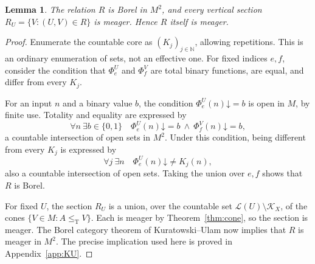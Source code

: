 \documentclass[11pt,a4paper]{article}
\newcommand{\N}{\mathbb N}
\newcommand{\leT}{\leq_{\mathrm T}}
\newcommand{\Core}[1]{\mathcal K_{#1}}
\newcommand{\Low}[1]{\mathcal L(#1)}
\newcommand{\down}{\mathord{\downarrow}}
\newtheorem{lemma}[theorem]{Lemma}
\theoremstyle{definition}\newtheorem{definition}[theorem]{Definition}
\theoremstyle{remark}\newtheorem{remark}[theorem]{Remark}
\begin{document}
\begin{lemma}\label{lem:bad-borel}
The relation $R$ is Borel in $M^2$, and every vertical section $R_U=\{V:(U,V)\in R\}$ is meager. Hence $R$ itself is meager.
\end{lemma}
\begin{proof}
Enumerate the countable core as $(K_j)_{j\in\N}$, allowing repetitions. This is an ordinary enumeration of sets, not an effective one. For fixed indices $e,f$, consider the condition that $\Phi_e^U$ and $\Phi_f^V$ are total binary functions, are equal, and differ from every $K_j$.

For an input $n$ and a binary value $b$, the condition $\Phi_e^U(n)\down=b$ is open in $M$, by finite use. Totality and equality are expressed by
\[
 \forall n\ \exists b\in\{0,1\}\quad
 \Phi_e^U(n)\down=b\ \land\ \Phi_f^V(n)\down=b,
\]
a countable intersection of open sets in $M^2$. Under this condition, being different from every $K_j$ is expressed by
\[
 \forall j\ \exists n\quad \Phi_e^U(n)\down\ne K_j(n),
\]
also a countable intersection of open sets. Taking the union over $e,f$ shows that $R$ is Borel.

For fixed $U$, the section $R_U$ is a union, over the countable set $\Low U\setminus\Core X$, of the cones $\{V\in M:A\leT V\}$. Each is meager by Theorem~\ref{thm:cone}, so the section is meager. The Borel category theorem of Kuratowski--Ulam now implies that $R$ is meager in $M^2$. The precise implication used here is proved in Appendix~\ref{app:KU}.
\end{proof}
\end{document}
